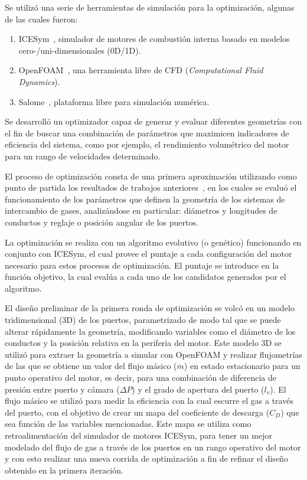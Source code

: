 Se utilizó una serie de herramientas de simulación para la optimización, algunas
de las cuales fueron:

\begin{enumerate}
    \item ICESym~\parencite{icesym}, simulador de motores de combustión interna basado en modelos cero-/uni-dimensionales (0D/1D).
    \item OpenFOAM~\parencite{openfoam}, una herramienta libre de CFD (\textit{Computational Fluid Dynamics}).
    \item Salome~\parencite{salome}, plataforma libre para simulación numérica.
\end{enumerate}


Se desarrolló un optimizador capaz de generar y evaluar diferentes geometrías
con el fin de buscar una combinación de parámetros que maximicen indicadores de
eficiencia del sistema, como por ejemplo, el rendimiento volumétrico del motor
para un rango de velocidades determinado.

El proceso de optimización consta de una primera aproximación utilizando como
punto de partida los resultados de trabajos anteriores~\parencite{lopez13}, en
los cuales se evaluó el funcionamiento de los parámetros que definen la
geometría de los sistemas de intercambio de gases, analizándose en particular:
diámetros y longitudes de conductos y reglaje o posición angular de los puertos.

La optimización se realiza con un algoritmo evolutivo (o genético) funcionando
en conjunto con ICESym, el cual provee el puntaje a cada configuración del
motor necesario para estos procesos de optimización.
%
El puntaje se introduce en la función objetivo, la cual evalúa a cada uno de los
candidatos generados por el algoritmo.

El diseño preliminar de la primera ronda de optimización se volcó en un modelo
tridimensional (3D) de los puertos, parametrizado de modo tal que se puede
alterar rápidamente la geometría, modificando variables como el diámetro de los
conductos y la posición relativa en la periferia del motor.
%
Este modelo 3D se utilizó para extraer la geometría a simular con OpenFOAM y
realizar flujometrías de las que se obtiene un valor del flujo másico
($\dot{m}$) en estado estacionario para un punto operativo del motor, es decir,
para una combinación de diferencia de presión entre puerto y cámara
($\Delta P$) y el grado de apertura del puerto ($l_{v}$).
%
El flujo másico se utilizó para medir la eficiencia con la cual escurre el gas a
través del puerto, con el objetivo de crear un mapa del coeficiente de descarga
($C_{D}$) que sea función de las variables mencionadas.
%
Este mapa se utiliza como retroalimentación del simulador de motores ICESym,
para tener un mejor modelado del flujo de gas a través de los puertos en un
rango operativo del motor y con esto realizar una nueva corrida de optimización
a fin de refinar el diseño obtenido en la primera iteración.
%


